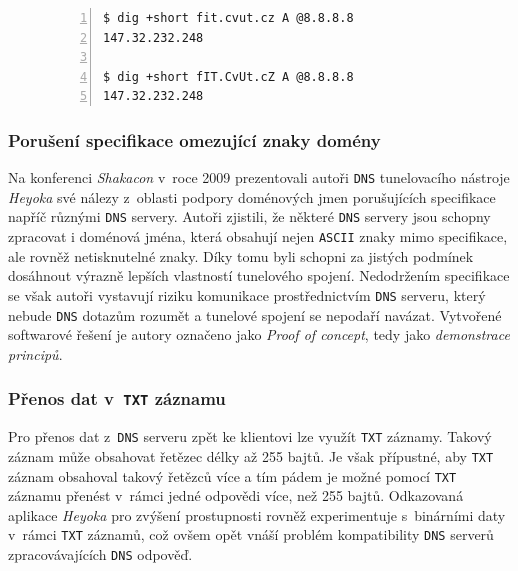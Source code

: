 \documentclass[thesis=M,czech]{FITthesis}[2012/10/20]
\begin{document}
    
    \begin{figure}[h]
	\begin{lstlisting}[caption=Demonstrace ignorování velikosti písmen v~doménových jménech,frame=single,numbers=left]
$ dig +short fit.cvut.cz A @8.8.8.8
147.32.232.248

$ dig +short fIT.CvUt.cZ A @8.8.8.8
147.32.232.248
      \end{lstlisting}
      \label{code:dns-case-insensitive}
    \end{figure}

    
    
    \subsubsection{Porušení specifikace omezující znaky domény}
    
    Na konferenci \textit{Shakacon}\cite{shakacon-heyoka} v~roce 2009 prezentovali autoři \texttt{DNS} tunelovacího nástroje \textit{Heyoka} své nálezy z~oblasti podpory doménových jmen porušujících specifikace napříč různými \texttt{DNS} servery. Autoři zjistili, že některé \texttt{DNS} servery jsou schopny zpracovat i doménová jména, která obsahují nejen \texttt{ASCII} znaky mimo specifikace, ale rovněž netisknutelné znaky. Díky tomu byli schopni za jistých podmínek dosáhnout výrazně lepších vlastností tunelového spojení. Nedodržením specifikace se však autoři vystavují riziku komunikace prostřednictvím \texttt{DNS} serveru, který nebude \texttt{DNS} dotazům rozumět a tunelové spojení se nepodaří navázat. Vytvořené softwarové řešení je autory označeno jako \textit{Proof of concept}, tedy jako \textit{demonstrace principů}.
    
    \subsubsection{Přenos dat v~\texttt{TXT} záznamu}
    
    Pro přenos dat z~\texttt{DNS} serveru zpět ke klientovi lze využít \texttt{TXT} záznamy. Takový záznam může obsahovat řetězec délky až 255 bajtů. Je však přípustné, aby \texttt{TXT} záznam obsahoval takový řetězců více a tím pádem je možné pomocí \texttt{TXT} záznamu přenést v~rámci jedné odpovědi více, než 255 bajtů. Odkazovaná aplikace \textit{Heyoka}\cite{shakacon-heyoka} pro zvýšení prostupnosti rovněž experimentuje s~binárními daty v~rámci \texttt{TXT} záznamů, což ovšem opět vnáší problém kompatibility \texttt{DNS} serverů zpracovávajících \texttt{DNS} odpověď.
    
\end{document}
